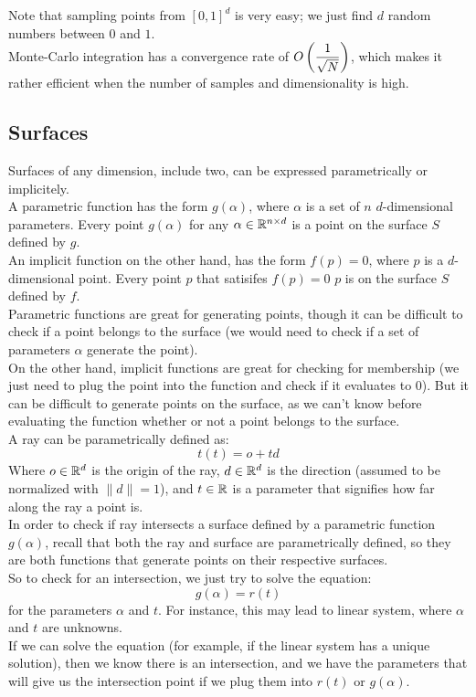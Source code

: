 \documentclass[12pt]{article}
\begin{document}
Note that sampling points from $[0, 1]^d$
is very easy; we just find $d$ random numbers
between $0$ and $1$. \\

Monte-Carlo integration has a convergence rate
of $O\left( \dfrac{1}{\sqrt{N}} \right)$, which makes it
rather efficient when the number of samples
and dimensionality is high. \\

\newpage

\subsection*{Surfaces}

Surfaces of any dimension, include two,
can be expressed parametrically or implicitely. \\

A parametric function has the form $g(\alpha)$,
where $\alpha$ is a set of $n$ $d$-dimensional 
parameters. Every point $g(\alpha)$ for any 
$\alpha \in \mathbb{R}^{n \times d}$ is a point on the
surface $S$ defined by $g$. \\

An implicit function on the other hand,
has the form $f(p) = 0$,
where $p$ is a $d$-dimensional point. 
Every point $p$ that satisifes 
$f(p) = 0$ $p$ is on the surface $S$ defined by $f$. \\

Parametric functions are great for generating
points, though it can be difficult to check 
if a point belongs to the surface 
(we would need to check if a set of
parameters $\alpha$ generate the point). \\

On the other hand, implicit functions are great
for checking for membership (we just need to
plug the point into the function and check
if it evaluates to $0$). But it can be difficult
to generate points on the surface, as we
can't know before evaluating the function
whether or not a point belongs to the surface. \\

A ray can be parametrically defined as:
\[ t(t) = o + td \]
Where $o \in \mathbb{R}^d$ is the origin of the ray,
$d \in \mathbb{R}^d$ is the direction (assumed to be
normalized with $\|d\| = 1$), and $t \in \mathbb{R}$
is a parameter that signifies how far along
the ray a point is. \\

In order to check if ray intersects a
surface defined by a parametric function
$g(\alpha)$, recall that both the ray and
surface are parametrically defined, so
they are both functions that generate points
on their respective surfaces. \\
So to check for an intersection, we just try to
solve the equation:
\[ g(\alpha) = r(t) \]
for the parameters $\alpha$ and $t$.
For instance, this may lead to linear system,
where $\alpha$ and $t$ are unknowns. \\
If we can solve the equation (for example,
if the linear system has a unique solution),
then we know there is an intersection, and
we have the parameters that will give us the
intersection point if we plug them into
$r(t)$ or $g(\alpha)$. \\
\end{document}
